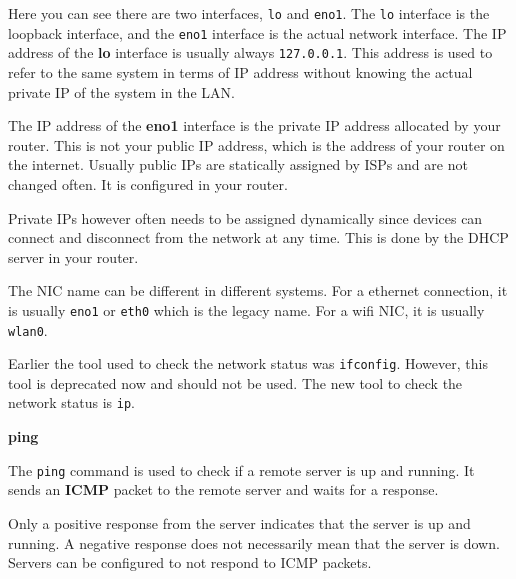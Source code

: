 Here you can see there are two interfaces, \lstinline|lo|
and \lstinline|eno1|. The \lstinline|lo| interface is the
loopback interface, and the \lstinline|eno1| interface
is the actual network interface. The IP address of
the \textbf{lo} interface is usually always \lstinline|127.0.0.1|.
This address is used to refer to the same system in terms
of IP address without knowing the actual private IP of
the system in the LAN.

The IP address of the \textbf{eno1} interface is the
private IP address allocated by your router. This is
not your public IP address, which is the address of
your router on the internet. Usually public IPs are
statically assigned by ISPs and are not changed often.
It is configured in your router.

Private IPs however often needs to be assigned dynamically
since devices can connect and disconnect from the network
at any time. This is done by the DHCP server in your router.

\begin{remark}
The NIC name can be different in different systems.
For a ethernet connection, it is usually \lstinline|eno1|
or \lstinline|eth0| which is the legacy name. For a wifi
NIC, it is usually \lstinline|wlan0|.
\end{remark}

\begin{remark}
  Earlier the tool used to check the network status
  was \lstinline|ifconfig|. However, this tool is deprecated
  now and should not be used. The new tool to check the
  network status is \lstinline|ip|.
\end{remark}

\textbf{ping}

The \lstinline|ping| command is used to check if a remote
server is up and running. It sends an \textbf{ICMP}
packet to the remote server and waits for a response.

\begin{remark}
  Only a positive response from the server indicates
  that the server is up and running. A negative response
  does not necessarily mean that the server is down.
  Servers can be configured to not respond to ICMP packets.
\end{remark}

